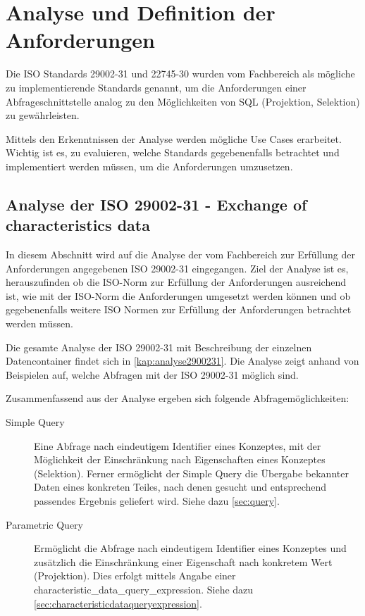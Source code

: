 \chapter{Analyse und Definition der Anforderungen } \label{kap:analyse_und_definition}

Die ISO Standards 29002-31 und 22745-30 wurden vom Fachbereich als mögliche zu implementierende Standards genannt, um die Anforderungen einer Abfrageschnittstelle analog zu den Möglichkeiten von SQL (Projektion, Selektion) zu gewährleisten.   

Mittels den Erkenntnissen der Analyse werden mögliche Use Cases erarbeitet. Wichtig ist es, zu evaluieren, welche Standards gegebenenfalls betrachtet und implementiert werden müssen, um die Anforderungen umzusetzen. 

\section{Analyse der ISO 29002-31 - Exchange of characteristics data}\label{kap:analyseiso2900231}

In diesem Abschnitt wird auf die Analyse der vom Fachbereich zur Erfüllung der Anforderungen angegebenen ISO 29002-31 eingegangen. Ziel der Analyse ist es, herauszufinden ob die ISO-Norm zur Erfüllung der Anforderungen ausreichend ist, wie mit der ISO-Norm die Anforderungen umgesetzt werden können und ob gegebenenfalls weitere ISO Normen zur Erfüllung der Anforderungen betrachtet werden müssen. 

Die gesamte Analyse der ISO 29002-31 mit Beschreibung der einzelnen Datencontainer findet sich in \autoref{kap:analyse2900231}. Die Analyse zeigt anhand von Beispielen auf, welche Abfragen mit der ISO 29002-31 möglich sind.

Zusammenfassend aus der Analyse ergeben sich folgende Abfragemöglichkeiten:
\begin{description}
\item[Simple Query] Eine Abfrage nach eindeutigem Identifier eines Konzeptes, mit der Möglichkeit der Einschränkung nach Eigenschaften eines Konzeptes (Selektion). Ferner ermöglicht der Simple Query die Übergabe bekannter Daten eines konkreten Teiles, nach denen gesucht und entsprechend passendes Ergebnis geliefert wird. Siehe dazu \autoref{sec:query}.
\item[Parametric Query] Ermöglicht die Abfrage nach eindeutigem Identifier eines Konzeptes und zusätzlich die Einschränkung einer Eigenschaft nach konkretem Wert (Projektion). Dies erfolgt mittels Angabe einer characteristic\_data\_query\_expression. Siehe dazu \autoref{sec:characteristicdataqueryexpression}.
\end{description}

